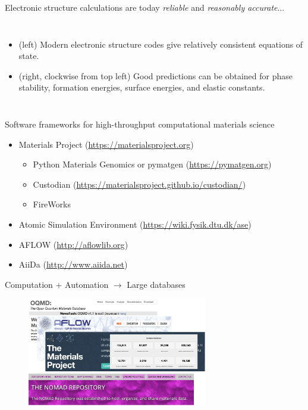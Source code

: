 \documentclass[aspectratio=169]{beamer}
\begin{document}
\begin{frame}{Electronic structure calculations are today \textit{reliable} and \textit{reasonably accurate}...}
\begin{columns}
\begin{itemize}
                \tiny
                \item (left) Modern electronic structure codes give relatively consistent equations of state.
                \item (right, clockwise from top left) Good predictions can be obtained for phase stability,\cite{sunThermodynamicScaleInorganic2016} formation energies, surface energies,\cite{tranSurfaceEnergiesElemental2016} and elastic constants\cite{dejongChartingCompleteElastic2015}.
            \end{itemize}
        \end{columns}
    \end{frame}

    \begin{frame}{Software frameworks for high-throughput computational materials science}
        \begin{itemize}
            \item Materials Project (\url{https://materialsproject.org})\cite{jainCommentaryMaterialsProject2013}
            \begin{itemize}
                \item Python Materials Genomics or pymatgen (\url{https://pymatgen.org})\cite{ongPythonMaterialsGenomics2013}
                \item Custodian (\url{https://materialsproject.github.io/custodian/})
                \item FireWorks \cite{jainFireWorksDynamicWorkflow2015}
            \end{itemize}
            \item Atomic Simulation Environment (\url{https://wiki.fysik.dtu.dk/ase})
            \item AFLOW (\url{http://aflowlib.org})\cite{curtaroloAFLOWLIBORGDistributed2012}
            \item AiiDa (\url{http://www.aiida.net})
        \end{itemize}
    \end{frame}


    \begin{frame}{Computation + Automation $\rightarrow$ Large databases}
        \begin{figure}
            \centering
            \includegraphics[width=0.7\textwidth]{figures/materials_databases.png}
        \end{figure}
    \end{frame}
\end{document}
